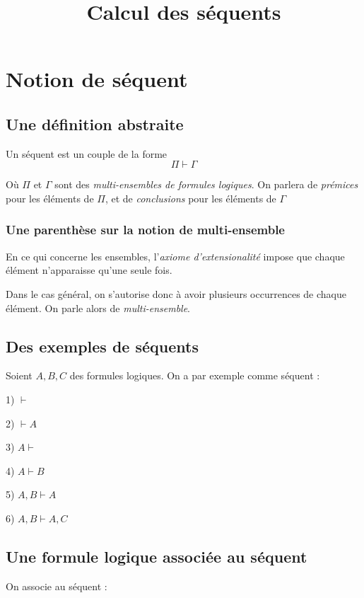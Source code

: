 \documentclass{article}
\title{Calcul des séquents}
\date{}
\begin{document}
\maketitle

\section{Notion de séquent}

\subsection{Une définition abstraite}

Un séquent est un couple de la forme
$$\Pi \vdash \Gamma $$

Où $\Pi$ et $\Gamma$ sont des \textit{multi-ensembles de formules logiques}. On parlera de \textit{prémices} pour les éléments de $\Pi$, et de \textit{conclusions} pour les éléments de $\Gamma$

\subsubsection{Une parenthèse sur la notion de multi-ensemble}

En ce qui concerne les ensembles, l'\textit{axiome d'extensionalité} impose que chaque élément n'apparaisse qu'une seule fois.

Dans le cas général, on s'autorise donc à avoir plusieurs occurrences de chaque élément. On parle alors de \textit{multi-ensemble}.

\subsection{Des exemples de séquents}

Soient $A,B,C$ des formules logiques. On a par exemple comme séquent :

1) $\vdash$

2) $\vdash A$

3) $A \vdash $

4) $A \vdash B$

5) $A,B \vdash A$

6) $A,B \vdash A,C$

\subsection{Une formule logique associée au séquent}

On associe au séquent :
\end{document}
